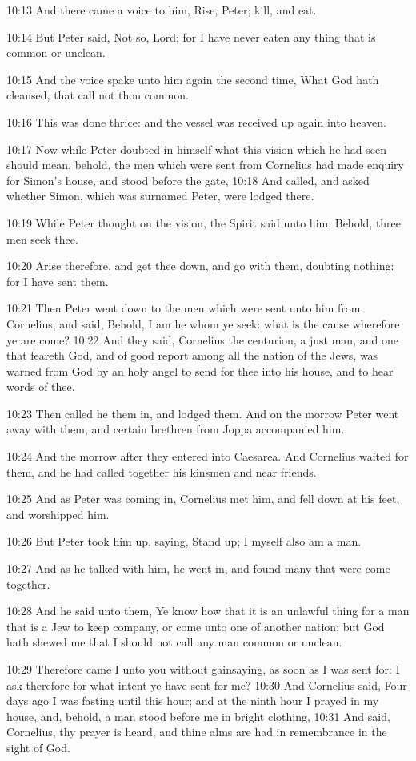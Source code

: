 10:13 And there came a voice to him, Rise, Peter; kill, and eat.

10:14 But Peter said, Not so, Lord; for I have never eaten any thing
that is common or unclean.

10:15 And the voice spake unto him again the second time, What God
hath cleansed, that call not thou common.

10:16 This was done thrice: and the vessel was received up again into
heaven.

10:17 Now while Peter doubted in himself what this vision which he had
seen should mean, behold, the men which were sent from Cornelius had
made enquiry for Simon's house, and stood before the gate, 10:18 And
called, and asked whether Simon, which was surnamed Peter, were lodged
there.

10:19 While Peter thought on the vision, the Spirit said unto him,
Behold, three men seek thee.

10:20 Arise therefore, and get thee down, and go with them, doubting
nothing: for I have sent them.

10:21 Then Peter went down to the men which were sent unto him from
Cornelius; and said, Behold, I am he whom ye seek: what is the cause
wherefore ye are come?  10:22 And they said, Cornelius the centurion,
a just man, and one that feareth God, and of good report among all the
nation of the Jews, was warned from God by an holy angel to send for
thee into his house, and to hear words of thee.

10:23 Then called he them in, and lodged them. And on the morrow Peter
went away with them, and certain brethren from Joppa accompanied him.

10:24 And the morrow after they entered into Caesarea. And Cornelius
waited for them, and he had called together his kinsmen and near
friends.

10:25 And as Peter was coming in, Cornelius met him, and fell down at
his feet, and worshipped him.

10:26 But Peter took him up, saying, Stand up; I myself also am a man.

10:27 And as he talked with him, he went in, and found many that were
come together.

10:28 And he said unto them, Ye know how that it is an unlawful thing
for a man that is a Jew to keep company, or come unto one of another
nation; but God hath shewed me that I should not call any man common
or unclean.

10:29 Therefore came I unto you without gainsaying, as soon as I was
sent for: I ask therefore for what intent ye have sent for me?  10:30
And Cornelius said, Four days ago I was fasting until this hour; and
at the ninth hour I prayed in my house, and, behold, a man stood
before me in bright clothing, 10:31 And said, Cornelius, thy prayer is
heard, and thine alms are had in remembrance in the sight of God.

